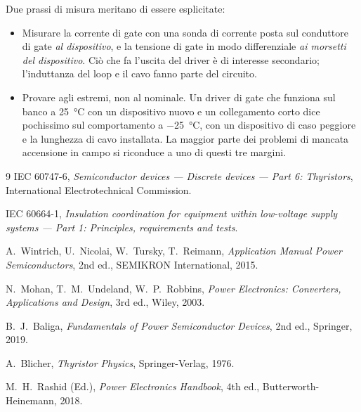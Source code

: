 \documentclass[11pt,a4paper]{article}
\begin{document}
Due prassi di misura meritano di essere esplicitate:

\begin{itemize}
  \item Misurare la corrente di gate con una sonda di corrente posta sul conduttore
        di gate \emph{al dispositivo}, e la tensione di gate in modo differenziale
        \emph{ai morsetti del dispositivo}. Ciò che fa l'uscita del driver è di
        interesse secondario; l'induttanza del loop e il cavo fanno parte del
        circuito.
  \item Provare agli estremi, non al nominale. Un driver di gate che funziona sul
        banco a \SI{25}{\celsius} con un dispositivo nuovo e un collegamento corto
        dice pochissimo sul comportamento a \SI{-25}{\celsius}, con un dispositivo di
        caso peggiore e la lunghezza di cavo installata. La maggior parte dei
        problemi di mancata accensione in campo si riconduce a uno di questi tre
        margini.
\end{itemize}

\begin{thebibliography}{9}
 IEC 60747-6, \emph{Semiconductor devices --- Discrete devices
--- Part 6: Thyristors}, International Electrotechnical Commission.

 IEC 60664-1, \emph{Insulation coordination for equipment within
low-voltage supply systems --- Part 1: Principles, requirements and tests}.

 A.~Wintrich, U.~Nicolai, W.~Tursky, T.~Reimann,
\emph{Application Manual Power Semiconductors}, 2nd ed., SEMIKRON International,
2015.

 N.~Mohan, T.~M.~Undeland, W.~P.~Robbins, \emph{Power Electronics:
Converters, Applications and Design}, 3rd ed., Wiley, 2003.

 B.~J.~Baliga, \emph{Fundamentals of Power Semiconductor Devices},
2nd ed., Springer, 2019.

 A.~Blicher, \emph{Thyristor Physics}, Springer-Verlag, 1976.

 M.~H.~Rashid (Ed.), \emph{Power Electronics Handbook}, 4th ed.,
Butterworth-Heinemann, 2018.
\end{thebibliography}
\end{document}
